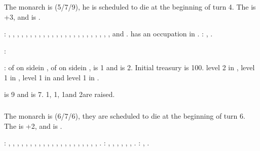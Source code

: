 \subsubsection{\paysmajeurFrance}
\aparag The monarch is  (5/7/9), he is scheduled to die
at the beginning of turn 4. The \STAB is +3, and \FRA is .

: \provinceFinistere, \provinceArmor,
\provinceMorbihan, \provinceVendee, \provincePoitou, \provinceLimousin,
\provinceTouraine, \provinceMaine, \provinceNormandie, \provinceCaux,
, \provinceOrleanais, \provinceBerry,
\provinceAuvergne, \provinceCevennes, \provinceQuercy, \provinceGuyenne,
\provinceBearn, \provinceLanguedoc, \provinceProvence, \provinceDauphine,
\provinceLyonnais, \provinceBourgogne, \provinceTroyes, \provinceChampagne and
\provincePicardie.
\bparag[] [BLP] \paysSavoie has an occupation in \provinceDauphine.
: \seazoneAcores, \seazoneCanarias.

:
\begin{modlist}
\item[\MA] \payssavoie
\end{modlist}

:
\bparag \MNU of  on side\facemoins in \provinceChampagne, \MNU of
 on side\facemoins in \provinceGuyenne, \FTI is 1 and \DTI is 2.
\bparag Initial treasury is 100\ducats.
\bparag \TradeFLEET level 2 in , level 1 in , level 1 in
 and level 1 in .

\aparag {} is 9 and  is
7. 1\ARMY\faceplus, 1\ARMY\facemoins, 1\ND and 2\NGD are raised.


\subsubsection{\paysmajeurEspagne}
\aparag The monarch is  (6/7/6), they are
scheduled to die at the beginning of turn 6. The \STAB is +2, and \SPA is
.

: \provinceGaliza, \provinceSalamanca,
\provinceExtremadura, \provinceHuelva, \provinceGibraltar, \provinceGranada,
\provinceMurcia, , \provinceToledo, , , \provinceAsturias, \provinceVizcaya,
\provinceNavarra, \provincePirineos, \provinceCatalunya, \provinceLeon,
\provinceCaceres, \provinceAndalucia, \provinceCordoba, \provinceValencia,
\provinceAragon.
: , \provinceRosselo,
\provinceSaldigna, \provinceSicilia, \provincePalermo, \provinceMalta,
\provinceCanarias.
: \seazoneAcores, \seazoneCanarias.


